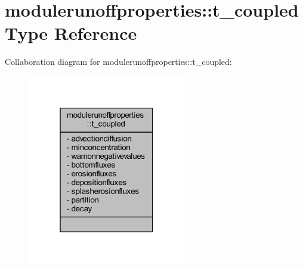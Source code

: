 \hypertarget{structmodulerunoffproperties_1_1t__coupled}{}\section{modulerunoffproperties\+:\+:t\+\_\+coupled Type Reference}
\label{structmodulerunoffproperties_1_1t__coupled}


Collaboration diagram for modulerunoffproperties\+:\+:t\+\_\+coupled\+:\nopagebreak
\begin{figure}[H]
\begin{center}
\leavevmode
\includegraphics[width=196pt]{structmodulerunoffproperties_1_1t__coupled__coll__graph}
\end{center}
\end{figure}
